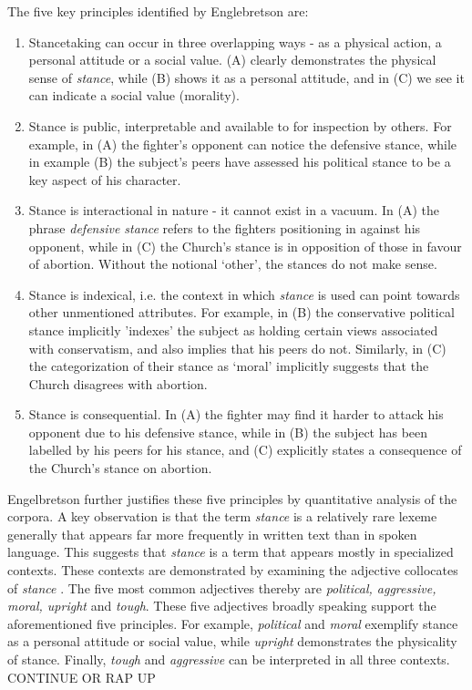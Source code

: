 \documentclass[Dissertation.tex]{subfiles}
\begin{document}
The five key principles identified by Englebretson \cite{englebretsonStancetakingDiscourseSubjectivity2007} are:
\begin{enumerate}
	\item Stancetaking can occur in three overlapping ways - as a physical action, a personal attitude or a social value. (A) clearly demonstrates the physical sense of \textit{stance}, while (B) shows it as a personal attitude, and in (C) we see it can indicate a social value (morality). 
	
	\item Stance is public, interpretable and available to for inspection by others. For example, in (A) the fighter's opponent can notice the defensive stance, while in example (B) the subject's peers have assessed his political stance to be a key aspect of his character.
	
	\item Stance is interactional in nature - it cannot exist in a vacuum. In (A) the  phrase \textit{defensive stance} refers to the fighters positioning in against his opponent, while in (C) the Church's stance is in opposition of those in favour of abortion. Without the notional `other', the stances do not make sense.
	
	\item Stance is indexical, i.e. the context in which \textit{stance} is used can point towards other unmentioned attributes. For example, in (B) the conservative political stance implicitly 'indexes' the subject as holding certain views  associated with conservatism, and also implies that his peers do not. Similarly, in (C) the categorization of their stance as `moral' implicitly suggests that the Church disagrees with abortion.
	
	\item Stance is consequential. In (A) the fighter may find it harder to attack his opponent due to his defensive stance, while in (B) the subject has been labelled by his peers for his stance, and (C) explicitly states a consequence of the Church's stance on abortion.
\end{enumerate}

Engelbretson \cite{englebretsonStancetakingDiscourseSubjectivity2007} further justifies these five principles by quantitative analysis of the corpora. A key observation is that the term \textit{stance} is a relatively rare lexeme generally that appears far more frequently in written text than in spoken language. This suggests that \textit{stance} is a term that appears mostly in specialized contexts. These contexts are demonstrated by examining the adjective collocates of \textit{stance} \cite{englebretsonStancetakingDiscourseSubjectivity2007}. The five most common adjectives thereby are \textit{political, aggressive, moral, upright} and \textit{tough}. These five adjectives broadly speaking support the aforementioned five principles. For example, \textit{political} and \textit{moral} exemplify stance as a personal attitude or social value, while \textit{upright} demonstrates the physicality of stance. Finally, \textit{tough} and \textit{aggressive} can be interpreted in all three contexts. CONTINUE OR RAP UP
\end{document}
